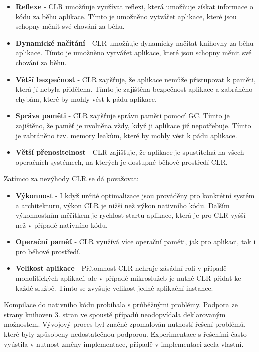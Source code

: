 \begin{itemize}
    \item  \textbf{Reflexe} - CLR umožňuje využívat reflexi, která umožňuje získat informace o kódu za běhu aplikace. Tímto je umožněno vytvářet aplikace, které jsou schopny měnit své chování za běhu.
    \item \textbf{Dynamické načítání} - CLR umožňuje dynamicky načítat knihovny za běhu aplikace. Tímto je umožněno vytvářet aplikace, které jsou schopny měnit své chování za běhu.
    \item \textbf{Větší bezpečnost} - CLR zajišťuje, že aplikace nemůže přistupovat k paměti, která jí nebyla přidělena. Tímto je zajištěna bezpečnost aplikace a zabráněno chybám, které by mohly vést k pádu aplikace.
    \item \textbf{Správa paměti} - CLR zajišťuje správu paměti pomocí GC. Tímto je zajištěno, že paměť je uvolněna vždy, když ji aplikace již nepotřebuje. Tímto je zabráněno tzv. memory leakům, které by mohly vést k pádu aplikace.
    \item \textbf{Větší přenositelnost} - CLR zajišťuje, že aplikace je spustitelná na všech operačních systémech, na kterých je dostupné běhové prostředí CLR.
\end{itemize}


Zatímco za nevýhody CLR se dá považovat:

\begin{itemize}
    \item  \textbf{Výkonnost} - I když určité optimalizace jsou prováděny pro konkrétní systém a architekturu, výkon CLR je nižší než výkon nativního kódu. Dalším výkonnostním měřítkem je rychlost startu aplikace, která je pro CLR vyšší než v případě nativního kódu.
    \item \textbf{Operační paměť} - CLR využívá více operační paměti, jak pro aplikaci, tak i pro běhové prostředí.
    \item \textbf{Velikost aplikace} - Přítomnost CLR nehraje zásádní roli v případě monolitických aplikací, ale v případě mikroslužeb je nutné CLR přidat ke každé službě. Tímto se zvyšuje velikost jedné aplikační instance.
\end{itemize}


Kompilace do nativního kódu probíhala s průběžnými problémy. Podpora ze strany knihoven 3. stran ve spoustě případů neodopvídala deklarovaným možnostem. Vývojový proces byl značně zpomalován nutností řešení problémů, které byly způsobeny nedostatečnou podporou. Experimentace s řešeními často vyústila v nutnost změny implementace, případě v implementaci zcela vlastní.

